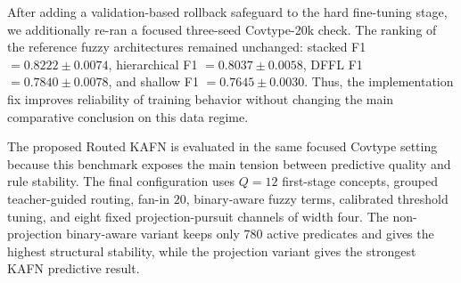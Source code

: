 \documentclass[runningheads]{llncs}
\begin{document}
\begin{table}[H]
\centering
\caption{Summary results of the compared architectures in the extended comparison (mean $\pm$ std over three seeds).}
\label{tab:extended_results}
\small
\setlength{\tabcolsep}{6pt}
\end{table}

After adding a validation-based rollback safeguard to the hard fine-tuning stage, we additionally re-ran a focused three-seed Covtype-20k check. The ranking of the reference fuzzy architectures remained unchanged: stacked F1 $=0.8222\pm0.0074$, hierarchical F1 $=0.8037\pm0.0058$, DFFL F1 $=0.7840\pm0.0078$, and shallow F1 $=0.7645\pm0.0030$. Thus, the implementation fix improves reliability of training behavior without changing the main comparative conclusion on this data regime.

The proposed Routed KAFN is evaluated in the same focused Covtype setting because this benchmark exposes the main tension between predictive quality and rule stability. The final configuration uses $Q=12$ first-stage concepts, grouped teacher-guided routing, fan-in $20$, binary-aware fuzzy terms, calibrated threshold tuning, and eight fixed projection-pursuit channels of width four. The non-projection binary-aware variant keeps only 780 active predicates and gives the highest structural stability, while the projection variant gives the strongest KAFN predictive result.
\end{document}
